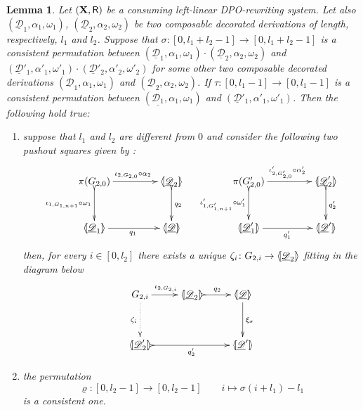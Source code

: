 \documentclass[a4paper]{article}
\def\R{\mathsf{R}}
\def\X{\textbf {\textup{X}}}
\newcommand{\dder}[1]{\mathscr{#1}}
\newcommand{\der}[1]{\underline{\dder{#1}}}
\newcommand{\lpro}{\langle \hspace{-1.85pt}[}
\newcommand{\rpro}{]\hspace{-1.85pt}\rangle}
\newcommand{\tpro}[1]{\lpro \der{#1}\rpro}
\newtheorem{lemma}[theorem]{Lemma}
\theoremstyle{definition}
\begin{document}
\begin{lemma}\label{lem:presuffix} Let $(\X, \R)$ be a consuming left-linear DPO-rewriting system.  Let also $(\der{D}_1, \alpha_1, \omega_1)$, $(\der{D}_2, \alpha_2, \omega_2)$ be two composable decorated derivations of length, respectively, $l_1$ and $l_2$. Suppose that $\sigma\colon [0, l_1+l_2-1]\to [0, l_1+l_2-1]$ is a consistent permutation between $(\der{D}_1, \alpha_1, \omega_1)\cdot (\der{D}_2, \alpha_2, \omega_2)$ and $(\der{D}'_1, \alpha'_1, \omega'_1)\cdot (\der{D}'_2, \alpha'_2, \omega'_2)$ for some other two composable decorated derivations $(\der{D}_1, \alpha_1, \omega_1)$ and $(\der{D}_2, \alpha_2, \omega_2)$.  If $\tau\colon [0,l_1-1]\to [0, l_1-1]$ is a consistent permutation between $(\der{D_1}, \alpha_1, \omega_1)$ and $(\der{D}'_1, \alpha'_1, \omega'_1)$. Then the following hold true:
	\begin{enumerate}
		\item suppose that $l_1$ and $l_2$ are different from $0$ and consider the following two pushout squares given by :
		\[\xymatrix@C=45pt@R=30pt{\pi(G_{2,0}) \ar@{>->}[d]_{\iota_{1, G_{1,n+1}} \circ \omega_1}\ar[r]^{\iota_{2, G_{2,0}} \circ \alpha_2}& \lpro \der{D}_2 \rpro \ar@{>->}[d]^{q_2} &  \pi(G'_{2,0}) \ar@{>->}[d]_{\iota'_{1, G'_{1,n+1}} \circ \omega'_1} \ar[r]^{\iota'_{2, G'_{2,0}} \circ \alpha'_2}& \lpro \der{D}'_2 \rpro \ar@{>->}[d]^{q'_2} \\ \lpro \der{D}_1 \rpro  \ar[r]_{q_1} & \tpro{D} & \lpro \der{D}'_1\rpro \ar[r]_{q'_1} & \lpro \der{D}'\rpro  }\]
		then, for every $i\in [0, l_2]$ there exists a unique $\zeta_i\colon G_{2,i}\to \lpro \der{D}_2\rpro $ fitting in the diagram below
		\[\xymatrix@R=35pt{G_{2,i} \ar[r]^{\iota_{2,G_{2,i}}} \ar@{.>}[d]_{\zeta_i}&\lpro \der{D}_2 \rpro \ar@{>->}[r]^{q_2}& \tpro{D} \ar[d]^{\xi_{\sigma}} \\
			\lpro \der{D}'_2 \rpro \ar@{>->}[rr]_{q'_2}&& \lpro \der{D}'\rpro }\]
		\item the permutation
		\[\varrho\colon [0,l_2-1]\to [0, l_2-1] \qquad i \mapsto \sigma(i+l_1)-l_1\]
		is a consistent one.
	\end{enumerate}
\end{lemma}
\end{document}
